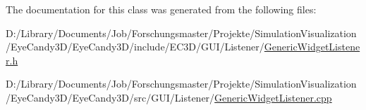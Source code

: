The documentation for this class was generated from the following files\+:\begin{DoxyCompactItemize}
\item 
D\+:/\+Library/\+Documents/\+Job/\+Forschungsmaster/\+Projekte/\+Simulation\+Visualization/\+Eye\+Candy3\+D/\+Eye\+Candy3\+D/include/\+E\+C3\+D/\+G\+U\+I/\+Listener/\mbox{\hyperlink{_generic_widget_listener_8h}{Generic\+Widget\+Listener.\+h}}\item 
D\+:/\+Library/\+Documents/\+Job/\+Forschungsmaster/\+Projekte/\+Simulation\+Visualization/\+Eye\+Candy3\+D/\+Eye\+Candy3\+D/src/\+G\+U\+I/\+Listener/\mbox{\hyperlink{_generic_widget_listener_8cpp}{Generic\+Widget\+Listener.\+cpp}}\end{DoxyCompactItemize}
